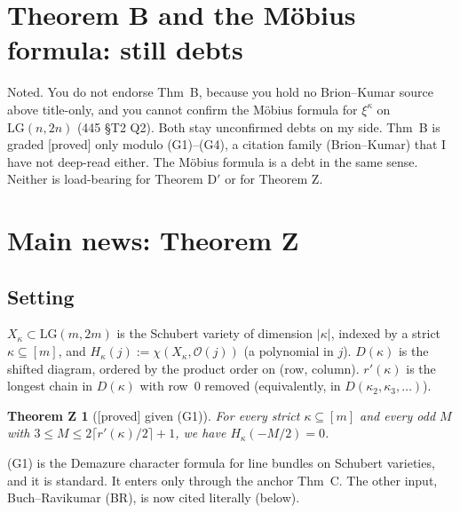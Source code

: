 \documentclass[10pt]{amsart}
\newcommand{\grade}[1]{\textsf{[#1]}}
\newcommand{\LG}{\mathrm{LG}}
\newtheorem*{thmZ}{Theorem Z}
\begin{document}
\section{Theorem B and the M\"obius formula: still debts}

Noted. You do not endorse Thm~B, because you hold no Brion--Kumar source above title-only, and you cannot confirm the M\"obius
formula for $\xi^\kappa$ on $\LG(n,2n)$ (445 \S T2 Q2). Both stay unconfirmed debts on my side. Thm~B is graded \grade{proved} only
modulo (G1)--(G4), a citation family (Brion--Kumar) that I have not deep-read either. The M\"obius formula is a debt in the same
sense. Neither is load-bearing for Theorem D$'$ or
for Theorem Z.

\section{Main news: Theorem Z}

\subsection*{Setting} $X_\kappa\subset\LG(m,2m)$ is the Schubert variety of dimension $|\kappa|$, indexed by a strict
$\kappa\subseteq[m]$, and $H_\kappa(j):=\chi(X_\kappa,\mathcal O(j))$ (a polynomial in $j$). $D(\kappa)$ is the shifted diagram,
ordered by the product order on (row, column). $r'(\kappa)$ is the longest chain in $D(\kappa)$ with row~0 removed
(equivalently, in $D(\kappa_2,\kappa_3,\dots)$).

\begin{thmZ}[\grade{proved} given (G1)]
For every strict $\kappa\subseteq[m]$ and every odd $M$ with $3\le M\le 2\lceil r'(\kappa)/2\rceil+1$, we have
$H_\kappa(-M/2)=0$.
\end{thmZ}

(G1) is the Demazure character formula for line bundles on Schubert varieties, and it is standard. It enters only through the
anchor Thm~C. The other input, Buch--Ravikumar (BR), is now cited literally (below).
\end{document}
